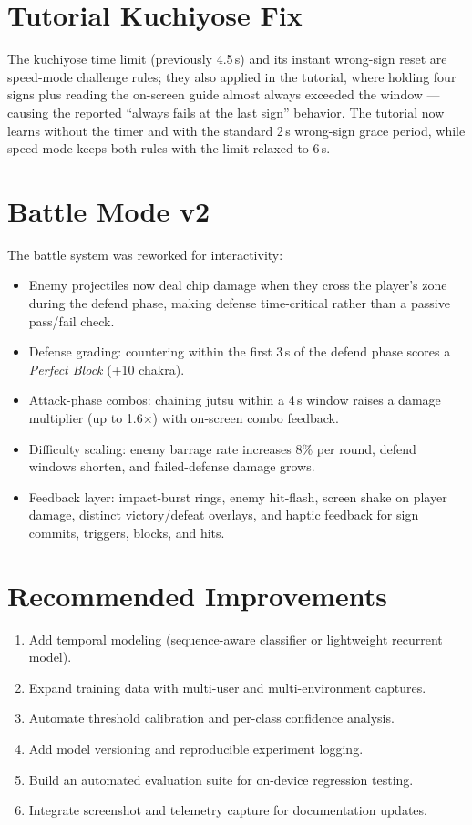 \section{Tutorial Kuchiyose Fix}
The kuchiyose time limit (previously 4.5\,s) and its instant
wrong-sign reset are speed-mode challenge rules; they also applied in the
tutorial, where holding four signs plus reading the on-screen guide almost
always exceeded the window --- causing the reported ``always fails at the
last sign'' behavior. The tutorial now learns without the timer and with
the standard 2\,s wrong-sign grace period, while speed mode keeps both
rules with the limit relaxed to 6\,s.

\section{Battle Mode v2}
The battle system was reworked for interactivity:
\begin{itemize}[leftmargin=2em]
\item Enemy projectiles now deal chip damage when they cross the player's zone during the defend phase, making defense time-critical rather than a passive pass/fail check.
\item Defense grading: countering within the first 3\,s of the defend phase scores a \emph{Perfect Block} (+10 chakra).
\item Attack-phase combos: chaining jutsu within a 4\,s window raises a damage multiplier (up to 1.6$\times$) with on-screen combo feedback.
\item Difficulty scaling: enemy barrage rate increases 8\% per round, defend windows shorten, and failed-defense damage grows.
\item Feedback layer: impact-burst rings, enemy hit-flash, screen shake on player damage, distinct victory/defeat overlays, and haptic feedback for sign commits, triggers, blocks, and hits.
\end{itemize}

\section{Recommended Improvements}
\begin{enumerate}[leftmargin=2em]
\item Add temporal modeling (sequence-aware classifier or lightweight recurrent model).
\item Expand training data with multi-user and multi-environment captures.
\item Automate threshold calibration and per-class confidence analysis.
\item Add model versioning and reproducible experiment logging.
\item Build an automated evaluation suite for on-device regression testing.
\item Integrate screenshot and telemetry capture for documentation updates.
\end{enumerate}

